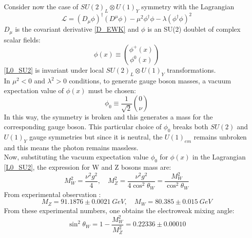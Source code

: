 Consider now the case of  $SU(2)_{L} \otimes U(1)_{Y}$ symmetry \cite{SU2_Hmechanism} with the Lagrangian
\begin{equation}
\mathcal{L} = (D_{\mu}\phi)^{\dagger}(D^{\mu}\phi)-\mu^{2}\phi^{\dagger}\phi-\lambda(\phi^{\dagger}\phi)^{2}
\label{L0_SU2}
\end{equation}
$D_{\mu}$ is the covariant derivative \ref{D_EWK} and $\phi$ is an SU(2) doublet of complex scalar fields:
\begin{equation}
\phi(x) \equiv {\phi^{+}(x) \choose \phi^0(x)}
\label{phi_SU2}
\end{equation}
\ref{L0_SU2} is invariant under local $SU(2)_{L} \otimes U(1)_{Y}$ transformations. \\
In $\mu^{2} < 0$ and $\lambda^{2} > 0$ conditions, to generate gauge boson masses, a vacuum expectation value of $\phi(x)$ must be chosen:
\begin{equation}
\phi_{0} \equiv \frac{1}{\sqrt{2}}{0 \choose \nu}
\label{SU2_U1_V0}
\end{equation}
In this way, the symmetry is broken and this generates a mass for the corresponding gauge boson. This particular choice of $\phi_{0}$ breaks both $SU(2)$ and $U(1)_{Y}$ gauge symmetries but since it is neutral, the $U(1)_{em}$ remains unbroken and this means the photon remains massless. \\
Now, substituting the vacuum expectation value $\phi_{0}$ for $\phi(x)$ in the Lagrangian \ref{L0_SU2}, the expression for W and Z bosons mass are:
\begin{equation}
M_{W}^{2} = \frac{\nu^{2}g^{2}}{4}, \quad M_{Z}^{2} = \frac{\nu^{2}g^{2}}{4\cos^{2}\theta_{W}}=\frac{M_{W}^{2}}{\cos^{2}{\theta_{W}}}
\label{WZ_mass_expression}
\end{equation}
From experimental observation \cite{PDG}:
\begin{equation}
M_{Z} = 91.1876\pm0.0021\ GeV, \quad M_{W} = 80.385\pm 0.015\ GeV
\end{equation}
From these experimental numbers, one obtains the electroweak mixing angle:
\begin{equation}
\sin^{2}\theta_{W} = 1-\frac{M^{2}_{W}}{M^{2}_{Z}} = 0.22336 \pm 0.00010
\end{equation}
